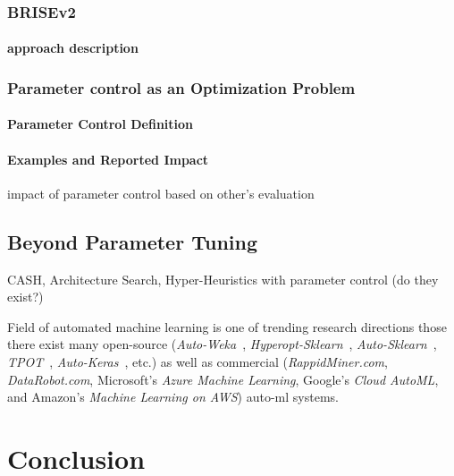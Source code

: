 \subsubsection{BRISEv2}
\paragraph{approach description}


\subsubsection{Parameter control as an Optimization Problem}\label{bg: parameter control}
\paragraph{Parameter Control Definition}
\paragraph{Examples and Reported Impact}
impact of parameter control based on other's evaluation


\subsection{Beyond Parameter Tuning} 

CASH, Architecture Search, Hyper-Heuristics with parameter control (do they exist?)


Field of automated machine learning is one of trending research directions those there exist many open-source (\textit{Auto-Weka}~\cite{thornton2013auto}, \textit{Hyperopt-Sklearn}~\cite{komer2014hyperopt}, \textit{Auto-Sklearn}~\cite{feurer2015efficient}, \textit{TPOT}~\cite{olson2019tpot}, \textit{Auto-Keras}~\cite{jin2019auto}, etc.) as well as commercial (\textit{RappidMiner.com}, \textit{DataRobot.com}, Microsoft’s \textit{Azure Machine Learning}, Google’s \textit{Cloud AutoML}, and Amazon's \textit{Machine Learning on AWS}) auto-ml systems.







\section{Conclusion}


